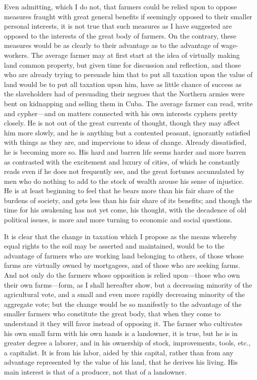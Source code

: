 \documentclass{book}
\begin{document}
Even admitting, which I do not, that farmers could be relied upon to oppose measures fraught with great general benefits if seemingly opposed to their smaller personal interests, it is not true that such measures as I have suggested are opposed to the interests of the great body of farmers. On the contrary, these measures would be as clearly to their advantage as to the advantage of wage-workers. The average farmer may at first start at the idea of virtually making land common property, but given time for discussion and reflection, and those who are already trying to persuade him that to put all taxation upon the value of land would be to put all taxation upon him, have as little chance of success as the slaveholders had of persuading their negroes that the Northern armies were bent on kidnapping and selling them in Cuba. The average farmer can read, write and cypher—and on matters connected with his own interests cyphers pretty closely. He is not out of the great currents of thought, though they may affect him more slowly, and he is anything but a contented peasant, ignorantly satisfied with things as they are, and impervious to ideas of change. Already dissatisfied, he is becoming more so. His hard and barren life seems harder and more barren as contrasted with the excitement and luxury of cities, of which he constantly reads even if he does not frequently see, and the great fortunes accumulated by men who do nothing to add to the stock of wealth arouse his sense of injustice. He is at least beginning to feel that he bears more than his fair share of the burdens of society, and gets less than his fair share of its benefits; and though the time for his awakening has not yet come, his thought, with the decadence of old political issues, is more and more turning to economic and social questions.

It is clear that the change in taxation which I propose as the means whereby equal rights to the soil may be asserted and maintained, would be to the advantage of farmers who are working land belonging to others, of those whose farms are virtually owned by mortgagees, and of those who are seeking farms. And not only do the farmers whose opposition is relied upon—those who own their own farms—form, as I shall hereafter show, but a decreasing minority of the agricultural vote, and a small and even more rapidly decreasing minority of the aggregate vote; but the change would be so manifestly to the advantage of the smaller farmers who constitute the great body, that when they come to understand it they will favor instead of opposing it. The farmer who cultivates his own small farm with his own hands is a landowner, it is true, but he is in greater degree a laborer, and in his ownership of stock, improvements, tools, etc., a capitalist. It is from his labor, aided by this capital, rather than from any advantage represented by the value of his land, that he derives his living. His main interest is that of a producer, not that of a landowner.
\end{document}
